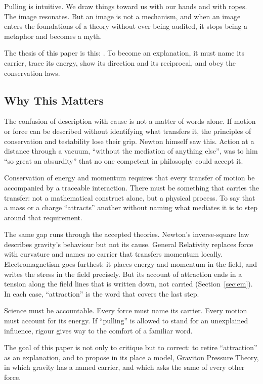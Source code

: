 \documentclass[11pt,a4paper]{article}
\begin{document}
Pulling is intuitive. We draw things toward us with our hands and with ropes. The image resonates. But an image is not a mechanism, and when an image enters the foundations of a theory without ever being audited, it stops being a metaphor and becomes a myth.

The thesis of this paper is this: . To become an explanation, it must name its carrier, trace its energy, show its direction and its reciprocal, and obey the conservation laws.

\subsection*{Why This Matters}

The confusion of description with cause is not a matter of words alone. If motion or force can be described without identifying what transfers it, the principles of conservation and testability lose their grip. Newton himself saw this. Action at a distance through a vacuum, ``without the mediation of anything else'', was to him ``so great an absurdity'' that no one competent in philosophy could accept it.

Conservation of energy and momentum requires that every transfer of motion be accompanied by a traceable interaction. There must be something that carries the transfer: not a mathematical construct alone, but a physical process. To say that a mass or a charge ``attracts'' another without naming what mediates it is to step around that requirement.

The same gap runs through the accepted theories. Newton's inverse-square law describes gravity's behaviour but not its cause. General Relativity replaces force with curvature and names no carrier that transfers momentum locally. Electromagnetism goes furthest: it places energy and momentum in the field, and writes the stress in the field precisely. But its account of attraction ends in a tension along the field lines that is written down, not carried (Section~\ref{sec:em}). In each case, ``attraction'' is the word that covers the last step.

Science must be accountable. Every force must name its carrier. Every motion must account for its energy. If ``pulling'' is allowed to stand for an unexplained influence, rigour gives way to the comfort of a familiar word.

The goal of this paper is not only to critique but to correct: to retire ``attraction'' as an explanation, and to propose in its place a model, Graviton Pressure Theory, in which gravity has a named carrier, and which asks the same of every other force.
\end{document}
